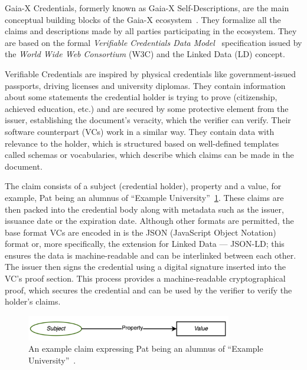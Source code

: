 Gaia-X Credentials, formerly known as Gaia-X Self-Descriptions, are the main conceptual building blocks of the Gaia-X ecosystem~\cite{gaiax_architecture_document}.
They formalize all the claims and descriptions made by all parties participating in the ecosystem.
They are based on the formal \textit{Verifiable Credentials Data Model}~\cite{verifiable_credentials} specification issued by the \textit{World Wide Web Consortium} (W3C) and the Linked Data (LD) concept.

Verifiable Credentials are inspired by physical credentials like government-issued passports, driving licenses and university diplomas.
They contain information about some statements the credential holder is trying to prove (citizenship, achieved education, etc.) and are secured by some protective element from the issuer, establishing the document's veracity, which the verifier can verify.
Their software counterpart (VCs) work in a similar way.
They contain data with relevance to the holder, which is structured based on well-defined templates called schemas or vocabularies, which describe which claims can be made in the document.

The claim consists of a subject (credential holder), property and a value, for example, Pat being an alumnus of ``Example University''~\ref{fig:verifiable-credential-claim}.
These claims are then packed into the credential body along with metadata such as the issuer, issuance date or the expiration date.
Although other formats are permitted, the base format VCs are encoded in is the JSON (JavaScript Object Notation) format or, more specifically, the extension for Linked Data --- JSON-LD; this ensures the data is machine-readable and can be interlinked between each other.
The issuer then signs the credential using a digital signature inserted into the VC's proof section.
This process provides a machine-readable cryptographical proof, which secures the credential and can be used by the verifier to verify the holder's claims.

\begin{figure}[h]
    \centering
    \includegraphics[width=0.8\textwidth]{figures/verifiable-credential-claim-example.png}
    \caption{An example claim expressing Pat being an alumnus of ``Example University''~\cite{verifiable_credentials}.}\label{fig:verifiable-credential-claim}
\end{figure}

